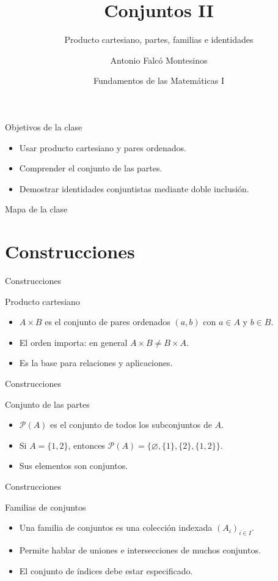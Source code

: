 \documentclass[aspectratio=169,11pt]{beamer}
\title[FdM I -- Clase 07]{Conjuntos II}
\subtitle{Producto cartesiano, partes, familias e identidades}
\author{Antonio Falcó Montesinos}
\institute{Universidad CEU Cardenal Herrera}
\date{Fundamentos de las Matemáticas I}
\begin{document}
\begin{frame}
  \titlepage
\end{frame}

\begin{frame}{Objetivos de la clase}
\begin{itemize}
  \item Usar producto cartesiano y pares ordenados.
  \item Comprender el conjunto de las partes.
  \item Demostrar identidades conjuntistas mediante doble inclusión.
\end{itemize}
\end{frame}

\begin{frame}{Mapa de la clase}
\tableofcontents
\end{frame}

\section{Construcciones}

\begin{frame}{Construcciones}
\begin{block}{Producto cartesiano}
\begin{itemize}
  \item \(A\times B\) es el conjunto de pares ordenados \((a,b)\) con \(a\in A\) y \(b\in B\).
  \item El orden importa: en general \(A\times B\neq B\times A\).
  \item Es la base para relaciones y aplicaciones.
\end{itemize}
\end{block}
\end{frame}

\begin{frame}{Construcciones}
\begin{block}{Conjunto de las partes}
\begin{itemize}
  \item \(\mathcal{P}(A)\) es el conjunto de todos los subconjuntos de \(A\).
  \item Si \(A=\{1,2\}\), entonces \(\mathcal{P}(A)=\{\varnothing,\{1\},\{2\},\{1,2\}\}\).
  \item Sus elementos son conjuntos.
\end{itemize}
\end{block}
\end{frame}

\begin{frame}{Construcciones}
\begin{block}{Familias de conjuntos}
\begin{itemize}
  \item Una familia de conjuntos es una colección indexada \((A_i)_{i\in I}\).
  \item Permite hablar de uniones e intersecciones de muchos conjuntos.
  \item El conjunto de índices debe estar especificado.
\end{itemize}
\end{block}
\end{frame}
\end{document}
